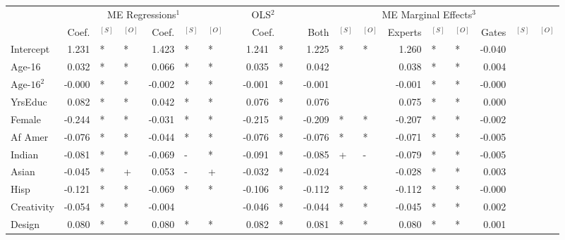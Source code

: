 \documentclass[12pt]{article}
\theoremstyle{definition}
\begin{document}
\begin{landscape}
\begin{table}
\begin{threeparttable}
\begin{tabular}[l]{l r l l r l l c r l c r l l r l l r l l}
  \hline
  & \multicolumn{6}{c}{ME Regressions$^{1}$} &&  \multicolumn{2}{c}{OLS$^{2}$} && \multicolumn{9}{c}{ME Marginal Effects$^{3}$} \\
  \cmidrule(l){2-7}    \cmidrule(l){9-10}     \cmidrule(l){12-20}
  & Coef.  & $^{[S]}$ & $^{[O]}$ &  Coef. & $^{[S]}$ & $^{[O]}$  && \multicolumn{2}{c}{Coef.} && Both   & $^{[S]}$ & $^{[O]}$ & Experts & $^{[S]}$ & $^{[O]}$ & Gates  & $^{[S]}$ & $^{[O]}$ \\
                  \cmidrule(l){2-4} \cmidrule(l){5-7} \cmidrule(l){9-10} \cmidrule(l){12-14} \cmidrule(l){15-17} \cmidrule(l){18-20}
  Intercept              &  1.231 & *   & *   &  1.423 & *   & *    &&  1.241 & *     &&  1.225 & *   & *    &  1.260  & *   & *   & -0.040 &     &   \\
  Age-16                 &  0.032 & *   & *   &  0.066 & *   & *    &&  0.035 & *     &&  0.042 &     &      &  0.038  & *   & *   &  0.004 &     &   \\
  $\textrm{Age-16}^{2}$  & -0.000 & *   & *   & -0.002 & *   & *    && -0.001 & *     && -0.001 &     &      & -0.001  & *   & *   & -0.000 &     &   \\
  YrsEduc                &  0.082 & *   & *   &  0.042 & *   & *    &&  0.076 & *     &&  0.076 &     &      &  0.075  & *   & *   &  0.000 &     &   \\
  Female                 & -0.244 & *   & *   & -0.031 & *   & *    && -0.215 & *     && -0.209 & *   & *    & -0.207  & *   & *   & -0.002 &     &   \\
  Af Amer                & -0.076 & *   & *   & -0.044 & *   & *    && -0.076 & *     && -0.076 & *   & *    & -0.071  & *   & *   & -0.005 &     &   \\
  Indian                 & -0.081 & *   & *   & -0.069 & -   & *    && -0.091 & *     && -0.085 & +   & -    & -0.079  & *   & *   & -0.005 &     &   \\
  Asian                  & -0.045 & *   & +   &  0.053 & -   & +    && -0.032 & *     && -0.024 &     &      & -0.028  & *   & *   &  0.003 &     &   \\
  Hisp                   & -0.121 & *   & *   & -0.069 & *   & *    && -0.106 & *     && -0.112 & *   & *    & -0.112  & *   & *   & -0.000 &     &   \\
  Creativity             & -0.054 & *   & *   & -0.004 &     &      && -0.046 & *     && -0.044 & *   & *    & -0.045  & *   & *   &  0.002 &     &   \\
  Design                 &  0.080 & *   & *   &  0.080 & *   & *    &&  0.082 & *     &&  0.081 & *   & *    &  0.080  & *   & *   &  0.001 &     &   \\

\end{tabular}
\end{threeparttable}
\end{table}
\end{landscape}
\end{document}
